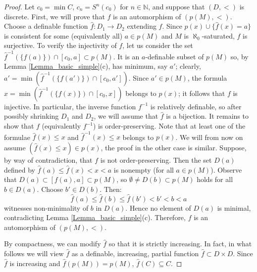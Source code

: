 \documentclass[10pt,a4paper]{amsart}
\theoremstyle{definition}
\begin{document}
\begin{proof}Let $c_0=\min C$, $c_n=S^n(c_0)$ for $n\in\mathbb N$, and  suppose that $(D,<)$ is discrete.   
First, we will prove that $f$ is an automorphism of $(p(M),<)$. Choose a definable function $\hat f:D_1\to D_2$ extending $f$. Since $p(x)\cup\{\hat f(x)=a\}$ is consistent for some (equivalently all) $a\in p(M)$ and $M$ is $\aleph_0$-saturated, $f$ is surjective.
To verify the injectivity of $f$, let us consider the set $\hat f^{-1}(\{f(a)\})\cap [c_0,a]\subset p(M)$. It is an $a$-definable subset of $p(M)$ so, by Lemma \ref{Lemma_basic_simple}(c), has minimum, say $a'$; clearly,   $a'=\min(\hat f^{-1}(\{f(a')\})\cap [c_0,a'])$. Since  $a'\in p(M)$, the formula  $x=\min(\hat f^{-1}(\{f(x)\})\cap [c_0,x])$ belongs to $p(x)$; it follows that $f$ is injective. 
In particular, the inverse function $f^{-1}$ is relatively definable, so after possibly shrinking $D_1$ and $D_2$, we will assume that $\hat f$ is a bijection.
It remains to show that $f$ (equivalently $f^{-1}$) is order-preserving. 
Note that at least one of the formulae $\hat f(x)\leq x$ and $\hat f^{-1}(x)\leq x$ belongs to $p(x)$. We will from now on assume $(\hat f(x)\leq x)\in p(x)$, the proof in the other case is similar.
Suppose, by way of contradiction, that $f$ is not order-preserving. Then the set $D(a)$ defined by $\hat f(a)\leq \hat f(x)<x<a$ is nonempty (for all $a\in p(M)$). Observe that  $D(a)\subset [f(a),a]\subset p(M)$,  so  $\emptyset\neq D(b)\subset p(M)$ holds for all $b\in D(a)$. Choose $b'\in D(b)$. Then:  
$$\hat f(a)\leq \hat f(b)\leq \hat f(b')<b'<b<a$$ witnesses non-minimality of $b$ in $D(a)$. Hence no element of $D(a)$ is minimal, contradicting Lemma \ref{Lemma_basic_simple}(c). Therefore, $f$ is an automorphism of $(p(M),<)$. 

By compactness, we can modify $\hat f$ so that it is strictly increasing. In fact, in what follows we will view $\hat f$ as a definable, increasing, partial function  $\hat f\subset D\times D$. Since $\hat f$ is increasing and $\hat f(p(M))=p(M)$, $\hat f(C)\subseteq C$.



\end{proof}
\end{document}
